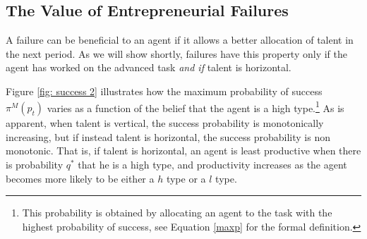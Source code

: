 \documentclass[12pt,american]{paper}
\theoremstyle{remark}
\begin{document}

\subsection{The Value of Entrepreneurial Failures}
A failure can be beneficial to an agent if it allows a better allocation of talent in the next period. As we will show shortly, failures have this property only if the agent has worked on the advanced task  \textit{and if} talent is horizontal. 

 Figure \ref{fig: success 2} illustrates how the maximum probability of success $\pi^M(p_t)$  varies as a function of the belief that the agent is a high type.\footnote{This probability is obtained by allocating an agent to the task with the highest probability of success, see Equation \ref{maxp} for the formal definition.} As is apparent,  when talent is vertical, the success probability is monotonically increasing, but if instead talent is horizontal, the success probability is non monotonic. That is, if talent is horizontal, an agent is least productive when there is probability $q^*$ that he is a high type, and productivity increases as the agent becomes more likely to be either a $h$ type or a $l$ type. 
\end{document}
